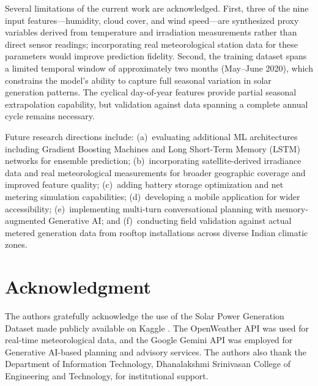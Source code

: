\documentclass[conference]{IEEEtran}
\begin{document}
Several limitations of the current work are acknowledged. First, three of the nine input features---humidity, cloud cover, and wind speed---are synthesized proxy variables derived from temperature and irradiation measurements rather than direct sensor readings; incorporating real meteorological station data for these parameters would improve prediction fidelity. Second, the training dataset spans a limited temporal window of approximately two months (May--June 2020), which constrains the model's ability to capture full seasonal variation in solar generation patterns. The cyclical day-of-year features provide partial seasonal extrapolation capability, but validation against data spanning a complete annual cycle remains necessary.

Future research directions include: (a)~evaluating additional ML architectures including Gradient Boosting Machines and Long Short-Term Memory (LSTM) networks for ensemble prediction; (b)~incorporating satellite-derived irradiance data and real meteorological measurements for broader geographic coverage and improved feature quality; (c)~adding battery storage optimization and net metering simulation capabilities; (d)~developing a mobile application for wider accessibility; (e)~implementing multi-turn conversational planning with memory-augmented Generative AI; and (f)~conducting field validation against actual metered generation data from rooftop installations across diverse Indian climatic zones.

\section*{Acknowledgment}

The authors gratefully acknowledge the use of the Solar Power Generation Dataset made publicly available on Kaggle \cite{b12}. The OpenWeather API was used for real-time meteorological data, and the Google Gemini API was employed for Generative AI-based planning and advisory services. The authors also thank the Department of Information Technology, Dhanalakshmi Srinivasan College of Engineering and Technology, for institutional support.
\end{document}
